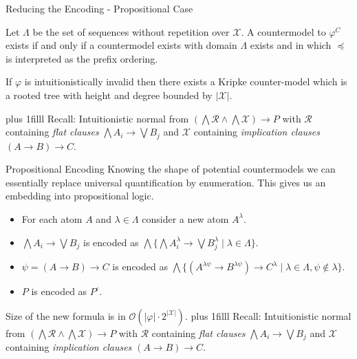 \documentclass{cubeamer}
\newcommand{\btVFill}{\vskip0pt plus 1filll}
\begin{document}
	\begin{frame}{Reducing the Encoding - Propositional Case}
		\vspace*{.5cm}
		\begin{lemma}
			Let $\Lambda$ be the set of sequences without repetition over $\mathcal X$. A countermodel to $\varphi^C$ exists if and only if a countermodel exists with domain $\Lambda$ exists and in which $\preceq$ is interpreted as the prefix ordering.
		\end{lemma}
		\begin{corollary}
			If $\varphi$ is intuitionistically invalid then there exists a Kripke counter-model which is a rooted tree with height and degree bounded by $|\mathcal X|$.
		\end{corollary}
		\btVFill
		Recall: Intuitionistic normal from $\left(\bigwedge\mathcal R\wedge\bigwedge\mathcal X\right)\to P$ with $\mathcal R$ containing  \emph{flat clauses} $\bigwedge A_i\to \bigvee B_j$ and $\mathcal X$ containing \emph{implication clauses} $(A\to B)\to C$.
	\end{frame}
	

	
	\begin{frame}{Propositional Encoding}
		Knowing the shape of potential countermodels we can essentially replace universal quantification by enumeration. This gives us an embedding into propositional logic.
		\begin{itemize}
			\item For each atom $A$ and $\lambda\in\Lambda$ consider a new atom $A^\lambda$.
			\item $\bigwedge A_i\to \bigvee B_j$ is encoded as $\bigwedge \{\bigwedge A_i^\lambda\to \bigvee B_j^\lambda\mid \lambda\in\Lambda\}$.
			\item $\psi = (A\to B)\to C$ is encoded as $\bigwedge\{(A^{\lambda\psi}\to B^{\lambda\psi})\to C^\lambda\mid \lambda\in\Lambda, \psi\notin\lambda\}$.
			\item $P$ is encoded as $P^\epsilon$.
		\end{itemize}
		Size of the new formula is in $\mathcal O(|\varphi|\cdot 2^{|\mathcal X|})$.
		\btVFill
		Recall: Intuitionistic normal from $\left(\bigwedge\mathcal R\wedge\bigwedge\mathcal X\right)\to P$ with $\mathcal R$ containing  \emph{flat clauses} $\bigwedge A_i\to \bigvee B_j$ and $\mathcal X$ containing \emph{implication clauses} $(A\to B)\to C$.
	\end{frame}
	
\end{document}

